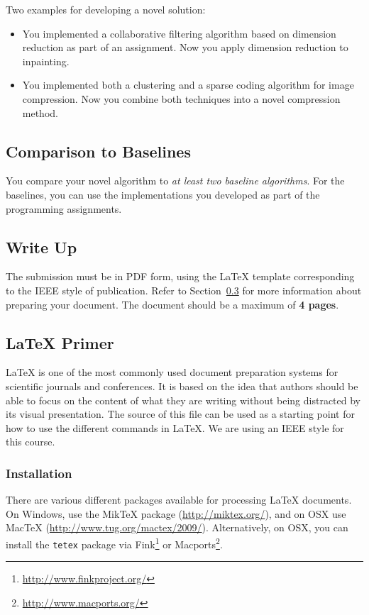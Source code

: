 \documentclass[10pt,conference,compsocconf]{IEEEtran}
\begin{document}
Two examples for developing a novel solution:
\begin{itemize}
\item You implemented a collaborative filtering algorithm based on dimension reduction as part of an assignment. Now you apply dimension reduction to inpainting.
\item You implemented both a clustering and a sparse coding algorithm for image compression. Now you combine both techniques into a novel compression method.
\end{itemize}

\subsection{Comparison to Baselines}

You compare your novel algorithm to \emph{at least two baseline algorithms}. For the baselines, you can use the implementations you developed as part of the programming assignments.


\subsection{Write Up}

The submission must be in PDF form, using the \LaTeX{} template corresponding to the IEEE style of publication. Refer to Section~\ref{sec:latex-primer} for more information about preparing your document. The document should be a maximum of {\bf 4 pages}.

\subsection{\LaTeX{} Primer}
\label{sec:latex-primer}

\LaTeX{} is one of the most commonly used document preparation systems for scientific journals and conferences. It is based on the idea that authors should be able to focus on the content of what they are writing without being distracted by its visual presentation. The source of this file can be used as a starting point for how to use
the different commands in \LaTeX{}. We are using an IEEE style for this course.

\subsubsection{Installation}

There are various different packages available for processing \LaTeX{} documents. On Windows, use the Mik\TeX{} package (\url{http://miktex.org/}), and on OSX use MacTeX
(\url{http://www.tug.org/mactex/2009/}). Alternatively, on OSX, you can install the \texttt{tetex} package via Fink\footnote{\url{http://www.finkproject.org/}} or Macports\footnote{\url{http://www.macports.org/}}.
\end{document}

